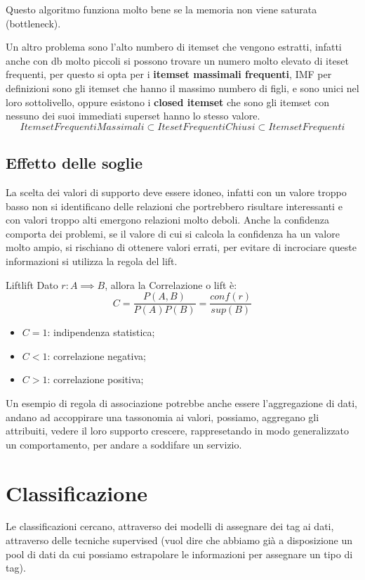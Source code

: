 \documentclass[12pt]{article}
\begin{document}
Questo algoritmo funziona molto bene se la memoria non viene saturata (bottleneck).

Un altro problema sono l'alto numbero di itemset che vengono estratti, infatti anche con db molto piccoli si possono trovare un numero molto elevato di iteset frequenti, per questo si opta per i \textbf{itemset massimali frequenti}, IMF per definizioni sono gli itemset che hanno il massimo numbero di figli, e sono unici nel loro sottolivello, oppure esistono i \textbf{closed itemset} che sono gli itemset con nessuno dei suoi immediati superset hanno lo stesso valore.
\[ ItemsetFrequentiMassimali \subset ItesetFrequentiChiusi \subset ItemsetFrequenti \]

\subsection{Effetto delle soglie}
La scelta dei valori di supporto deve essere idoneo, infatti con un valore troppo basso non si identificano delle relazioni che portrebbero risultare interessanti e con valori troppo alti emergono relazioni molto deboli. Anche la confidenza comporta dei problemi, se il valore di cui si calcola la confidenza ha un valore molto ampio, si rischiano di ottenere valori errati, per evitare di incrociare queste informazioni si utilizza la regola del lift.
\begin{definition}{Lift}{lift}
    Dato $ r: A \implies B $, allora la Correlazione o lift \`e:
    \[ C = \frac{P(A,B)}{P(A)P(B)} = \frac{conf(r)}{sup(B)} \]
    \begin{itemize}
        \item $C = 1$: indipendenza statistica;
        \item $C < 1$: correlazione negativa;
        \item $C > 1$: correlazione positiva;
    \end{itemize}
\end{definition}


Un esempio di regola di associazione potrebbe anche essere l'aggregazione di dati, andano ad accoppirare una tassonomia ai valori, possiamo, aggregano gli attribuiti, vedere il loro supporto crescere, rappresetando in modo generalizzato un comportamento, per andare a soddifare un servizio.


\newpage
\section{Classificazione}
Le classificazioni cercano, attraverso dei modelli di assegnare dei tag ai dati, attraverso delle tecniche supervised (vuol dire che abbiamo gi\`a a disposizione un pool di dati da cui possiamo estrapolare le informazioni per assegnare un tipo di tag).
\end{document}
